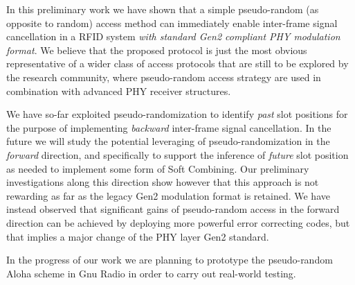 \documentclass[12pt,draftcls,onecolumn]{IEEEtran}
\begin{document}
In this preliminary work we have shown that a simple pseudo-random (as opposite to random) access method can immediately enable inter-frame signal cancellation in a RFID system \emph{with standard Gen2 compliant PHY modulation format}.
We believe that the proposed protocol is just the most obvious representative of a wider class of  access protocols that are still to be explored by the research community, where pseudo-random access strategy are used in combination with advanced  PHY receiver structures.

We have so-far exploited pseudo-randomization to identify \emph{past} slot positions for the purpose of implementing \emph{backward} inter-frame signal cancellation. In the future we will study the potential leveraging of pseudo-randomization in the \emph{forward} direction, and specifically to support the inference of \emph{future} slot position as needed to implement some form of Soft Combining. Our preliminary investigations along this direction show however that this approach is not rewarding as far as the legacy Gen2 modulation  format is retained. We have instead observed that significant gains of pseudo-random access in the forward direction can be achieved by deploying more powerful error correcting codes, but that implies a major change of the  PHY layer Gen2 standard.

In the progress of our work we are planning to prototype the pseudo-random Aloha scheme in Gnu Radio \cite{donno} in order to carry out real-world testing.







\end{document}
